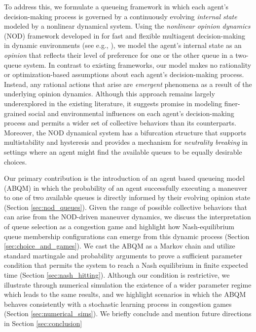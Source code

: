 \documentclass[conference]{IEEEtran}
\begin{document}
To address this, we formulate a queueing framework in which each agent's decision-making process is governed by a
continuously evolving \emph{internal state} modeled by a nonlinear dynamical system.
Using the \emph{nonlinear opinion dynamics} (NOD) framework developed in \cite{bizyaeva2022nonlinear} for fast and flexible multiagent decision-making in dynamic environments 
(see e.g., \cite{cathcart2023proactive, hu2025think}),
we model the agent's internal state as an \emph{opinion} that reflects their level of preference for one or the other queue in a two-queue system. 
In contrast to existing frameworks, our model makes no rationality or optimization-based assumptions about each agent's decision-making process. Instead, any rational actions that arise are \emph{emergent} phenomena as a result of the underlying opinion dynamics. 
Although this approach remains largely underexplored in the existing literature, it suggests promise in modeling finer-grained social and environmental influences on each agent's decision-making process 
and permits a wider set of collective behaviors
than its counterparts. Moreover, the NOD dynamical system has a bifurcation structure that supports multistability and hysteresis \cite{bizyaeva2022nonlinear} and provides a mechanism for \emph{neutrality breaking} in settings where an agent might find the available queues to be equally desirable choices.

Our primary contribution is the introduction of an agent based queueing model (ABQM) in which the probability of an agent successfully executing a maneuver to one of two available queues is directly informed by their evolving opinion state (Section \ref{sec:nod_queues}). 
Given the range of possible collective behaviors that can arise from the NOD-driven maneuver dynamics, we discuss the interpretation of queue selection as a congestion game and highlight how Nash-equilibrium queue membership configurations can emerge from this dynamic process (Section \ref{sec:choice_and_games}). We cast the ABQM as a Markov chain and utilize standard martingale and probability arguments to prove a sufficient parameter condition that permits the system to reach a Nash equilibrium in finite expected time (Section \ref{sec:nash_hitting}). Although our condition is restrictive, we illustrate through numerical simulation the existence of a wider parameter regime which leads to the same results, and we highlight scenarios in which the ABQM behaves consistently with a stochastic learning process in congestion games (Section \ref{sec:numerical_sims}). We briefly conclude and mention future directions in Section \ref{sec:conclusion}
\end{document}
